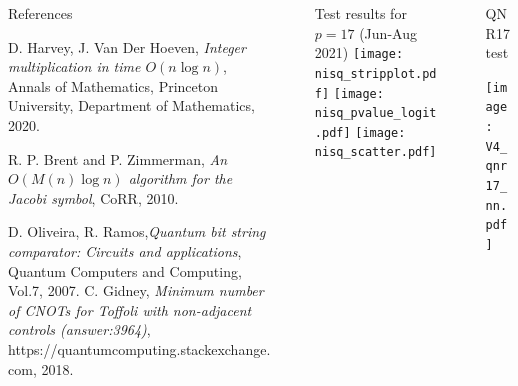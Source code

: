\documentclass[final]{beamer}
\newlength{\sepwidth}
\newlength{\colwidth}
\newlength{\circwidth}
\newcommand{\separatorcolumn}{\begin{column}{\sepwidth}\end{column}}
\begin{document}
\begin{frame}[t]
\begin{columns}[t]
\begin{column}{\colwidth}
\begin{block}{References}
{\begin{thebibliography}{100}
   D. Harvey, J. Van Der Hoeven, \emph{{Integer multiplication in time $O(n \log n)$}}, {{Annals of Mathematics}}, {{Princeton University, Department of Mathematics}}, 2020.

 R. P. Brent and P. Zimmerman, \emph{An {$O(M(n) \log n)$} algorithm for the Jacobi symbol}, {CoRR}, 2010.

     {D. Oliveira, R. Ramos},\emph{Quantum bit string comparator: Circuits and applications}, {Quantum Computers and Computing}, Vol.7, 2007.
   C. Gidney, \emph{Minimum number of CNOTs for Toffoli with non-adjacent controls (answer:3964)}, {https://quantumcomputing.stackexchange.com}, 2018. 
\end{thebibliography}
}
  \end{block}

\end{column}
\separatorcolumn

\begin{column}{\colwidth}
  \begin{block}{Test results for $p=17$ \hspace{1ex}  (Jun-Aug 2021)}
    \texttt{[image: nisq\_stripplot.pdf]}
    \texttt{[image: nisq\_pvalue\_logit.pdf]}
    \texttt{[image: nisq\_scatter.pdf]}

  \end{block}


\end{column}

\separatorcolumn

\begin{column}{\circwidth}
  \begin{block}{QNR17 test}
    \begin{center}
    \texttt{[image: V4\_qnr17\_nn.pdf]}


\end{center}
\end{block}
\end{column}
\end{columns}
\end{frame}
\end{document}
